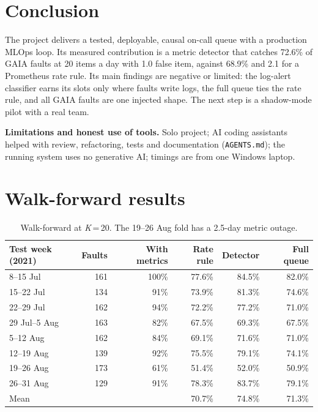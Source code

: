 \documentclass[12pt,a4paper]{article}
\newcommand{\tablefont}{\fontsize{10}{11.5}\selectfont}
\begin{document}
\section{Conclusion}
The project delivers a tested, deployable, causal on-call queue with a production MLOps loop. Its measured contribution is a metric detector that catches 72.6\% of GAIA faults at 20 items a day with 1.0 false item, against 68.9\% and 2.1 for a Prometheus rate rule. Its main findings are negative or limited: the log-alert classifier earns its slots only where faults write logs, the full queue ties the rate rule, and all GAIA faults are one injected shape. The next step is a shadow-mode pilot with a real team.

\textbf{Limitations and honest use of tools.} Solo project; AI coding assistants helped with review, refactoring, tests and documentation (\texttt{AGENTS.md}); the running system uses no generative AI; timings are from one Windows laptop.

\newpage
\appendix
\section{Walk-forward results}
\begin{table}[ht]
\centering\tablefont
\begin{tabular}{@{}lrrrrr@{}}
\toprule
Test week (2021) & Faults & With metrics & Rate rule & Detector & Full queue\\
\midrule
8--15 Jul & 161 & 100\% & 77.6\% & 84.5\% & 82.0\%\\
15--22 Jul & 134 & 91\% & 73.9\% & 81.3\% & 74.6\%\\
22--29 Jul & 162 & 94\% & 72.2\% & 77.2\% & 71.0\%\\
29 Jul--5 Aug & 163 & 82\% & 67.5\% & 69.3\% & 67.5\%\\
5--12 Aug & 162 & 84\% & 69.1\% & 71.6\% & 71.0\%\\
12--19 Aug & 139 & 92\% & 75.5\% & 79.1\% & 74.1\%\\
19--26 Aug & 173 & 61\% & 51.4\% & 52.0\% & 50.9\%\\
26--31 Aug & 129 & 91\% & 78.3\% & 83.7\% & 79.1\%\\
\midrule
Mean & & & 70.7\% & 74.8\% & 71.3\%\\
\bottomrule
\end{tabular}
\caption{Walk-forward at \textit{K}\,=\,20. The 19--26 Aug fold has a 2.5-day metric outage.}
\end{table}
\end{document}

